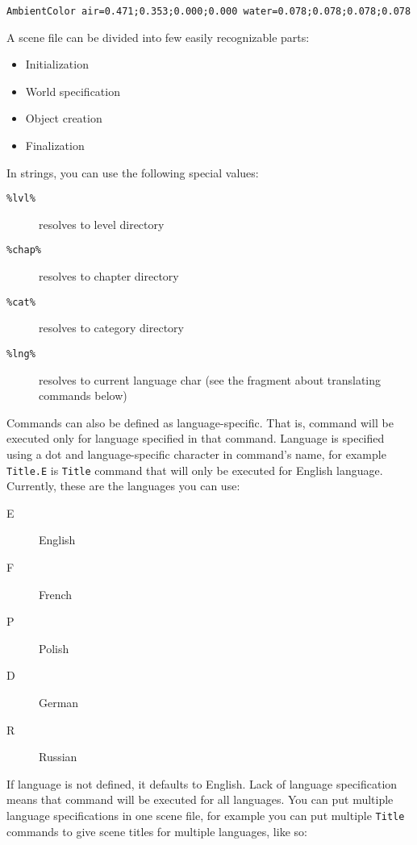 \begin{verbatim}
AmbientColor air=0.471;0.353;0.000;0.000 water=0.078;0.078;0.078;0.078
\end{verbatim}

A scene file can be divided into few easily recognizable parts:

\begin{itemize}
    \item Initialization
    \item World specification
    \item Object creation
    \item Finalization
\end{itemize}

In strings, you can use the following special values:

\begin{description}
    \item[\texttt{\%lvl\%}] resolves to level directory
    \item[\texttt{\%chap\%}] resolves to chapter directory
    \item[\texttt{\%cat\%}] resolves to category directory 
    \item[\texttt{\%lng\%}] resolves to current language char (see the fragment about translating commands below)
\end{description}

Commands can also be defined as language-specific. That is, command will be executed only for language specified in that command. Language is specified using a dot and language-specific character in command's name, for example \verb|Title.E| is \verb|Title| command that will only be executed for English language. Currently, these are the languages you can use:

\begin{description}
    \item[E] English
    \item[F] French
    \item[P] Polish
    \item[D] German
    \item[R] Russian
\end{description}

If language is not defined, it defaults to English. Lack of language specification means that command will be executed for all languages. You can put multiple language specifications in one scene file, for example you can put multiple \verb|Title| commands to give scene titles for multiple languages, like so:

